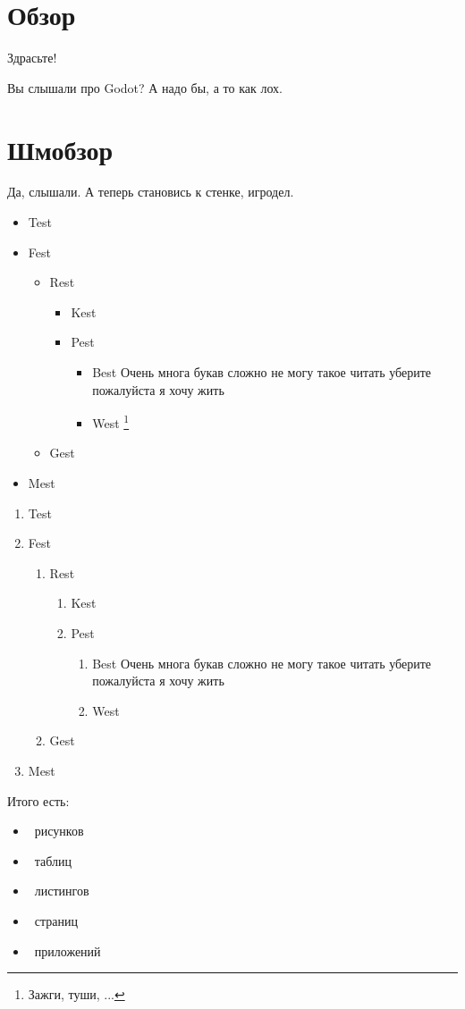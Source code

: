 \section{Обзор}

Здрасьте!

Вы слышали про Godot\cite{godot}? А надо бы, а то как лох.

\section{Шмобзор}

Да, слышали. А теперь становись к стенке, игродел.

\begin{itemize}
    \item Test
    \item Fest
    \begin{itemize}
        \item Rest
        \begin{itemize}
            \item Kest
            \item Pest
            \begin{itemize}
                \item Best Очень многа букав сложно не могу такое читать уберите пожалуйста я хочу жить
                \item West \footnote{Зажги, туши, ...}
            \end{itemize}
        \end{itemize}
        \item Gest
    \end{itemize}
    \item Mest
\end{itemize}

\begin{enumerate}
    \item Test
    \item Fest
    \begin{enumerate}
        \item Rest
        \begin{enumerate}
            \item Kest
            \item Pest
            \begin{enumerate}
                \item Best Очень многа букав сложно не могу такое читать уберите пожалуйста я хочу жить
                \item West
            \end{enumerate}
        \end{enumerate}
        \item Gest
    \end{enumerate}
    \item Mest
\end{enumerate}

Итого есть:

\begin{itemize}
    \item \totalfigurescount\ рисунков
    \item \totaltablescount\ таблиц
    \item \totallistingscount\ листингов
    \item \totalpagescount\ страниц
    \item \totalappendicescount\ приложений
\end{itemize}
